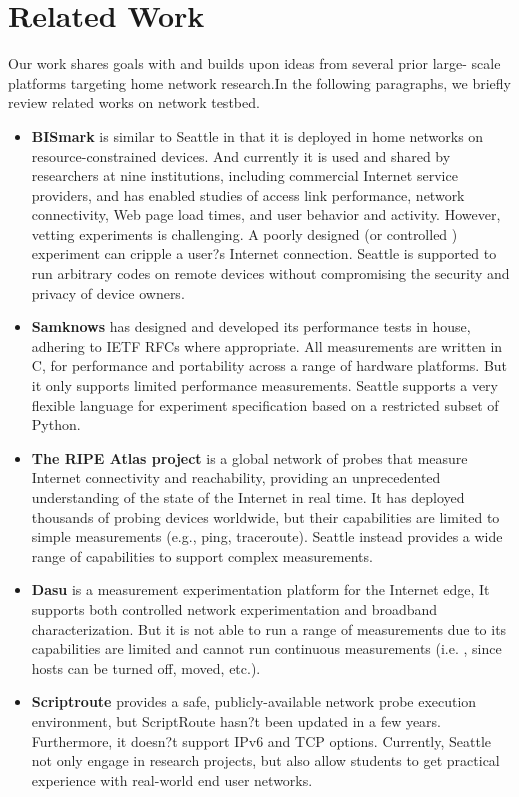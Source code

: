 \section{Related Work}
\label{sec.related_work}
Our work shares goals with and builds upon ideas from several prior large-
scale platforms targeting home network research.In the following paragraphs, 
we briefly review related works on network testbed. 
\begin{itemize}
\item \textbf{BISmark} is similar to Seattle in that it is deployed in home 
networks on resource-constrained devices. And currently it is used and 
shared by researchers at nine institutions, including commercial Internet 
service providers, and has enabled studies of access link performance, 
network connectivity, Web page load times, and user behavior and activity. 
However, vetting experiments is challenging. A poorly designed (or controlled
) experiment can cripple a user?s Internet connection. Seattle is supported 
to run arbitrary codes on remote devices without compromising the security 
and privacy of device owners.
\item \textbf{Samknows} has designed and developed its performance tests in 
house, adhering to IETF RFCs where appropriate. All measurements are written 
in C, for performance and portability across a range of hardware platforms. 
But it only supports limited performance measurements. Seattle supports a 
very flexible language for experiment specification based on a restricted 
subset of Python.
\item \textbf{The RIPE Atlas project} is a global network of probes that 
measure Internet connectivity and reachability, providing an unprecedented 
understanding of the state of the Internet in real time. It has deployed 
thousands of probing devices worldwide, but their capabilities are limited 
to simple measurements (e.g., ping, traceroute). Seattle instead provides a 
wide range of capabilities to support complex measurements. 
\item \textbf{Dasu} is a measurement experimentation platform for the 
Internet edge, It supports both controlled network experimentation and 
broadband characterization. But it is not able to run a range of  
measurements due to its capabilities are limited and cannot run continuous 
measurements (i.e. , since hosts can be turned off, moved, etc.).
\item \textbf{Scriptroute} provides a safe, publicly-available network probe 
execution environment, but ScriptRoute hasn?t been updated in a few years. 
Furthermore, it doesn?t support IPv6 and TCP options. Currently, Seattle not 
only engage in research projects, but also  allow students to get practical 
experience with real-world end user networks.


\end{itemize}

